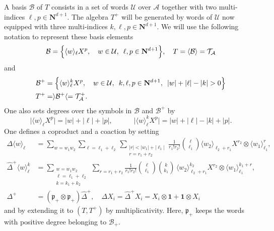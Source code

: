 \documentclass[11pt]{preprint}
\newcommand{\mcB}{\mathcal{B}}
\newcommand{\mcU}{\mathcal{U}}
\def\one{\mathbf{1}}
\renewcommand{\lg}{\langle}
\newcommand{\rg}{\rangle}
\newcommand{\bfN}{\mathbf{N}}
\begin{document}
	A basis $\mcB$ of $T$ consists in a set of words $\mcU$ over $\mathcal{A}$ together with two multi-indices $\ell,p\in\bfN^{d+1}$. The algebra $T^+$ will be generated by words of $\mcU$ now equipped with three multi-indices $k,\ell,p\in\bfN^{d+1}$. We will use the following notation to represent these basis elements
	\begin{equation}
		\mcB = \Big\{ \lg w\rg_\ell X^p, \quad  w \in \mcU, \enskip \ell,p\in\bfN^{d+1}   \Big\}, \quad T =  \lg  \mcB \rg = \mathcal{T}_{\mathcal{A}}
	\end{equation}
	and
	\begin{equation} \begin{aligned}
		\mcB^+ & = \Big\{ \lg w\rg_\ell^k  X^p, \quad  w \in \mcU, \enskip k,\ell,p\in\bfN^{d+1}, \enskip |w|+|\ell|-|k| >0  \Big\}
		\\ T^+ &= \rg \mcB^+ \lg = \mathcal{T}_{\mathcal{A}}^+.
		\end{aligned}
	\end{equation}
	One also sets degrees over the symbols in $\mcB$ and $\mcB^+$ by
	\begin{equation}
		\big| \lg w\rg_\ell X^p \big| = |w|+|\ell|+|p|, \qquad\quad \big| \lg w \rg_\ell^k X^p \big| = |w|+|\ell|-|k|+|p|.
	\end{equation}
	One defines a coproduct and a coaction by setting
	\begin{equation}
		\label{coproduct_words}
		\begin{aligned}
		\Delta \lg w \rg_\ell & = \sum_{w=w_1w_2}\sum_{\ell=\ell_1+\ell_2 } \sum_{\substack{ |r|<|w_1|+|\ell_1| \\ r=r_1+r_2}} \frac{1}{r_1!r_2!} \binom{\ell}{\ell_1}   \lg w_2 \rg_{\ell_2+r_1}X^{r_2} \otimes  \lg w_1 \rg_{\ell_1}^r,
	\\
		\hat{\Delta}^{\!+} \lg w \rg_\ell^k & = \sum_{\substack{ w=w_1w_2 \\ \ell=\ell_1+\ell_2 \\ k=k_1+k_2}} \sum_{ r=r_1+r_2}\frac{1}{r_1!r_2!} \binom{\ell}{\ell_1}\binom{k}{k_1} \, \lg w_2 \rg_{\ell_2+r_1}^{k_2} X^{r_2} \otimes  \lg w_1 \rg_{\ell_1}^{k_1+r},
		\\ 	\Delta^{\!+} & = \left( \mathfrak{p}_+  \otimes \mathfrak{p}_+ \right) \hat{\Delta}^{\!+}, \quad \Delta X_i = \hat{\Delta}^{\!+} X_i = X_i \otimes \one + \one \otimes X_i 
		\end{aligned}
	\end{equation}
	and by extending it to $(T,T^+)$ by multiplicativity.
	Here, $ \mathfrak{p}_+ $ keeps the words with positive degree belonging to $\mathcal{B}_+$. \label{model_words}
\end{document}
